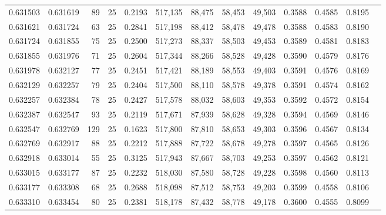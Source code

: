 \begin{tabular}{rrrrrrrrrrrrr}
0.631503 & 0.631619 &    89 &  25 &                                     0.2193 & 517,135 &  88,475 &  58,453 &  49,503 & 0.3588 & 0.4585 & 0.8195 \\
0.631621 & 0.631724 &    63 &  25 &                                     0.2841 & 517,198 &  88,412 &  58,478 &  49,478 & 0.3588 & 0.4583 & 0.8190 \\
0.631724 & 0.631855 &    75 &  25 &                                     0.2500 & 517,273 &  88,337 &  58,503 &  49,453 & 0.3589 & 0.4581 & 0.8183 \\
0.631855 & 0.631976 &    71 &  25 &                                     0.2604 & 517,344 &  88,266 &  58,528 &  49,428 & 0.3590 & 0.4579 & 0.8176 \\
0.631978 & 0.632127 &    77 &  25 &                                     0.2451 & 517,421 &  88,189 &  58,553 &  49,403 & 0.3591 & 0.4576 & 0.8169 \\
0.632129 & 0.632257 &    79 &  25 &                                     0.2404 & 517,500 &  88,110 &  58,578 &  49,378 & 0.3591 & 0.4574 & 0.8162 \\
0.632257 & 0.632384 &    78 &  25 &                                     0.2427 & 517,578 &  88,032 &  58,603 &  49,353 & 0.3592 & 0.4572 & 0.8154 \\
0.632387 & 0.632547 &    93 &  25 &                                     0.2119 & 517,671 &  87,939 &  58,628 &  49,328 & 0.3594 & 0.4569 & 0.8146 \\
0.632547 & 0.632769 &   129 &  25 &                                     0.1623 & 517,800 &  87,810 &  58,653 &  49,303 & 0.3596 & 0.4567 & 0.8134 \\
0.632769 & 0.632917 &    88 &  25 &                                     0.2212 & 517,888 &  87,722 &  58,678 &  49,278 & 0.3597 & 0.4565 & 0.8126 \\
0.632918 & 0.633014 &    55 &  25 &                                     0.3125 & 517,943 &  87,667 &  58,703 &  49,253 & 0.3597 & 0.4562 & 0.8121 \\
0.633015 & 0.633177 &    87 &  25 &                                     0.2232 & 518,030 &  87,580 &  58,728 &  49,228 & 0.3598 & 0.4560 & 0.8113 \\
0.633177 & 0.633308 &    68 &  25 &                                     0.2688 & 518,098 &  87,512 &  58,753 &  49,203 & 0.3599 & 0.4558 & 0.8106 \\
0.633310 & 0.633454 &    80 &  25 &                                     0.2381 & 518,178 &  87,432 &  58,778 &  49,178 & 0.3600 & 0.4555 & 0.8099 \\

\end{tabular}
